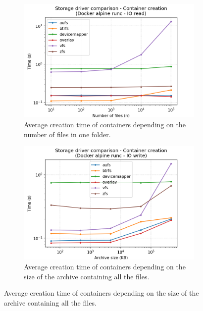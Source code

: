 \begin{figure}[!h]
    \begin{subfigure}{.5\textwidth}
      \centering
      \includegraphics[width=\linewidth]{images/storage-driver/storage-driver-creation-Docker-alpine-runc---IO-read.png}
      \caption{Average creation time of containers depending on the number of files in one folder.}
      \label{fig:storage-driver:io-read-create}
    \end{subfigure}
    \begin{subfigure}{.5\textwidth}
      \centering
      \includegraphics[width=\linewidth]{images/storage-driver/storage-driver-creation-Docker-alpine-runc---IO-write.png}
      \caption{Average creation time of containers depending on the size of the archive containing all the files.}
      \label{fig:storage-driver:io-write-create}
    \end{subfigure}
    

\end{figure}
